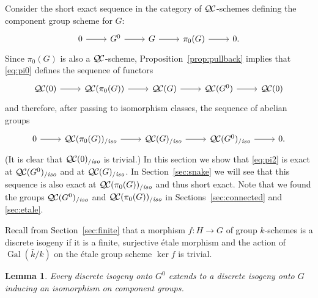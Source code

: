 \documentclass[11pt]{amsart}
\theoremstyle{plain}
\newtheorem{lemma}[theorem]{Lemma}
\theoremstyle{definition}
\theoremstyle{remark}
\newcommand{\bFq}{\bar{k}}
\newcommand{\Fq}{k}
\DeclareMathOperator{\Gal}{Gal}
\newcommand{\QC}{{\mathcal{Q\hskip-0.8pt C}}}
\newcommand{\QCiso}[1]{\QC(#1)_{/\textit{iso}}}
\begin{document}
Consider the short exact sequence in the category of $\QC$-schemes
defining the component group scheme for $G$:
\begin{equation}\label{eq:pi0}
\begin{tikzcd}
0 \rar & G^0 \rar & G \rar & \pi_0(G) \rar & 0.
\end{tikzcd}
\end{equation}
Since $\pi_0(G)$ is also a $\QC$-scheme, 
Proposition~\ref{prop:pullback} implies that \eqref{eq:pi0} defines the sequence of functors
\begin{equation}\label{eq:pi1}
\begin{tikzcd}
\QC(0) \rar & \QC(\pi_0(G)) \rar & \QC(G) \rar & \QC(G^0) \rar & \QC(0)
\end{tikzcd}
\end{equation}
and therefore, after passing to isomorphism classes, the sequence of abelian groups 
\begin{equation}\label{eq:pi2}
\begin{tikzcd}
0 \rar & \QCiso{\pi_0(G)} \rar & \QCiso{G} \rar & \QCiso{G^0} \rar & 0.
\end{tikzcd}
\end{equation}
(It is clear that $\QCiso{0}$ is trivial.)
In this section we show that \eqref{eq:pi2} is exact at $\QCiso{G^0}$ and at $\QCiso{G}$. In Section~\ref{sec:snake} we will see that this sequence is also exact at $\QCiso{\pi_0(G)}$ and thus short exact.
Note that we found the groups $\QCiso{G^0}$
and $\QCiso{\pi_0(G)}$
in Sections~\ref{sec:connected} and \ref{sec:etale}.

Recall from Section~\ref{sec:finite} that 
a morphism $f : H\to G$ of group $\Fq$-schemes is a discrete isogeny 
if it is a finite, surjective \'etale morphism and 
the action of $\Gal(\bFq/\Fq)$ on the \'etale group scheme $\ker f$ is trivial.

\begin{lemma}\label{lemma:ext}
Every discrete isogeny onto $G^0$ extends to a discrete
isogeny onto $G$ inducing an isomorphism on component groups.
\end{lemma}
\end{document}
